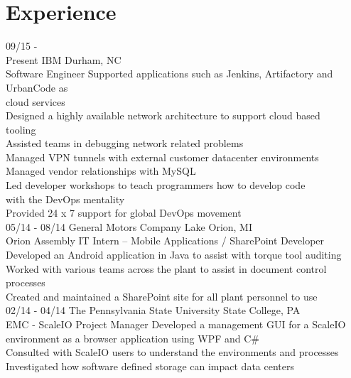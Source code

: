 \documentclass[]{friggeri-cv}
\begin{document}
\section{Experience}
\begin{entrylist}
  \entry
    {09/15 - \\Present}
    {IBM \hfill \hfill Durham, NC}
    {\\Software Engineer}
    {Supported applications such as Jenkins, Artifactory and UrbanCode as \\cloud services\\
    Designed a highly available network architecture to support cloud based \\tooling\\
    Assisted teams in debugging network related problems\\
    Managed VPN tunnels with external customer datacenter environments\\
    Managed vendor relationships with MySQL\\
    Led developer workshops to teach programmers how to develop code \\with the DevOps mentality\\
    Provided 24 x 7 support for global DevOps movement\\}
  \entry
    {05/14 - 08/14}
    {General Motors Company \hfill \hfill Lake Orion, MI}
    {\\Orion Assembly IT Intern – Mobile Applications / SharePoint Developer}
    {Developed an Android application in Java to assist with torque tool auditing\\
    Worked with various teams across the plant to assist in document control processes\\
    Created and maintained a SharePoint site for all plant personnel to use\\}
  \entry
    {02/14 - 04/14}
    {The Pennsylvania State University \hfill \hfill State College, PA}
    {\\EMC - ScaleIO Project Manager}
    {Developed a management GUI for a ScaleIO environment as a browser application using WPF and C#\\
    Consulted with ScaleIO users to understand the environments and processes\\
    Investigated how software defined storage can impact data centers\\}

\end{entrylist}
\end{document}
